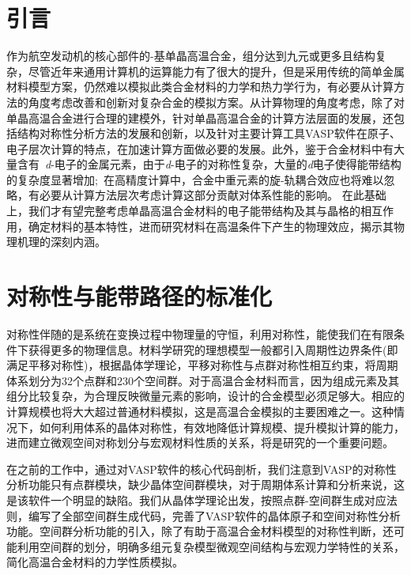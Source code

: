 \section{引言}
作为航空发动机的核心部件的-基单晶高温合金，组分达到九元或更多且结构复杂，尽管近年来通用计算机的运算能力有了很大的提升，但是采用传统的简单金属材料模型方案，仍然难以模拟此类合金材料的力学和热力学行为，有必要从计算方法的角度考虑改善和创新对复杂合金的模拟方案。从计算物理的角度考虑，除了对单晶高温合金进行合理的建模外，针对单晶高温合金的计算方法层面的发展，还包括结构对称性分析方法的发展和创新，以及针对主要计算工具\textrm{VASP}软件在原子、电子层次计算的特点，在加速计算方面做必要的发展。此外，鉴于合金材料中有大量含有~\textit{d}-电子的金属元素，由于\textit{d}-电子的对称性复杂，大量的\textit{d}电子使得能带结构的复杂度显著增加;~在高精度计算中，合金中重元素的旋-轨耦合效应也将难以忽略，有必要从计算方法层次考虑计算这部分贡献对体系性能的影响。 在此基础上，我们才有望完整考虑单晶高温合金材料的电子能带结构及其与晶格的相互作用，确定材料的基本特性，进而研究材料在高温条件下产生的物理效应，揭示其物理机理的深刻内涵。

\section{对称性与能带路径的标准化}
对称性伴随的是系统在变换过程中物理量的守恒，利用对称性，能使我们在有限条件下获得更多的物理信息。材料学研究的理想模型一般都引入周期性边界条件(即满足平移对称性)，根据晶体学理论，平移对称性与点群对称性相互约束，将周期体系划分为32个点群和230个空间群。对于高温合金材料而言，因为组成元素及其组分比较复杂，为合理反映微量元素的影响，设计的合金模型必须足够大。相应的计算规模也将大大超过普通材料模拟，这是高温合金模拟的主要困难之一。这种情况下，如何利用体系的晶体对称性，有效地降低计算规模、提升模拟计算的能力，进而建立微观空间对称划分与宏观材料性质的关系，将是研究的一个重要问题。

在之前的工作中，通过对\textrm{VASP}软件的核心代码剖析，我们注意到\textrm{VASP}的对称性分析功能只有点群模块，缺少晶体空间群模块，对于周期体系计算和分析来说，这是该软件一个明显的缺陷。我们从晶体学理论出发，按照点群-空间群生成对应法则，编写了全部空间群生成代码，完善了\textrm{VASP}软件的晶体原子和空间对称性分析功能。空间群分析功能的引入，除了有助于高温合金材料模型的对称性判断，还可能利用空间群的划分，明确多组元复杂模型微观空间结构与宏观力学特性的关系，简化高温合金材料的力学性质模拟。

